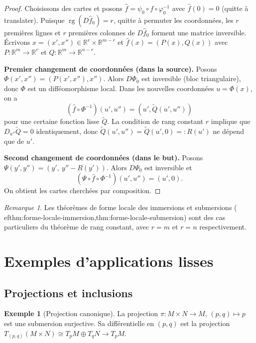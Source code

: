 \documentclass[12pt,a4paper,openany]{book}
\theoremstyle{definition}
\newtheorem{exemple}[definition]{Exemple}
\theoremstyle{plain}
\theoremstyle{remark}
\newtheorem{remarque}[definition]{Remarque}
\newcommand{\R}{\mathbb{R}}
\DeclareMathOperator{\rg}{rg}
\begin{document}
\begin{proof}
Choisissons des cartes et posons $\hat{f} = \psi_0 \circ f \circ \varphi_0^{-1}$
avec $\hat{f}(0) = 0$ (quitte à translater). Puisque $\rg(D\hat{f}_0) = r$,
quitte à permuter les coordonnées, les $r$ premières lignes et $r$ premières
colonnes de $D\hat{f}_0$ forment une matrice inversible. Écrivons $x = (x',
x'') \in \R^r \times \R^{m-r}$ et $\hat{f}(x) = (P(x), Q(x))$ avec $P \colon
\R^m \to \R^r$ et $Q \colon \R^m \to \R^{n-r}$.

\textbf{Premier changement de coordonnées (dans la source).}
Posons $\Phi(x', x'') = (P(x', x''), x'')$. Alors $D\Phi_0$ est inversible
(bloc triangulaire), donc $\Phi$ est un difféomorphisme local. Dans les
nouvelles coordonnées $u = \Phi(x)$, on a
\[
    (\hat{f} \circ \Phi^{-1})(u', u'') = (u', \widetilde{Q}(u', u''))
\]
pour une certaine fonction lisse $\widetilde{Q}$. La condition de rang constant
$r$ implique que $D_{u''}\widetilde{Q} = 0$ identiquement, donc
$\widetilde{Q}(u', u'') = \widetilde{Q}(u', 0) =: R(u')$ ne dépend que de
$u'$.

\textbf{Second changement de coordonnées (dans le but).}
Posons $\Psi(y', y'') = (y',\ y'' - R(y'))$. Alors $D\Psi_0$ est inversible
et
\[
    (\Psi \circ \hat{f} \circ \Phi^{-1})(u', u'') = (u', 0).
\]
On obtient les cartes cherchées par composition.
\end{proof}

\begin{remarque}\label{rem:rang-constant-generalise}
Les théorèmes de forme locale des immersions et submersions
(
ef{thm:forme-locale-immersion,thm:forme-locale-submersion}) sont des cas
particuliers du théorème de rang constant, avec $r = m$ et $r = n$
respectivement.
\end{remarque}


\section{Exemples d'applications lisses}
\label{sec:exemples-applications}

\subsection{Projections et inclusions}

\begin{exemple}[Projection canonique]\label{ex:projection}
La projection $\pi \colon M \times N \to M$, $(p, q) \mapsto p$ est une
submersion surjective. Sa différentielle en $(p, q)$ est la projection
$T_{(p,q)}(M \times N) \cong T_pM \oplus T_qN \to T_pM$.
\end{exemple}
\end{document}
